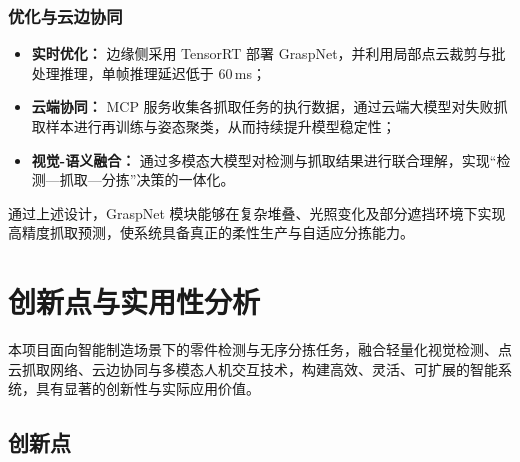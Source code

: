 \documentclass{cumcmthesis}
\begin{document}
\subsubsection{优化与云边协同}

\begin{itemize}
    \item \textbf{实时优化：} 边缘侧采用 TensorRT 部署 GraspNet，并利用局部点云裁剪与批处理推理，单帧推理延迟低于 60\,ms；
    \item \textbf{云端协同：} MCP 服务收集各抓取任务的执行数据，通过云端大模型对失败抓取样本进行再训练与姿态聚类，从而持续提升模型稳定性；
    \item \textbf{视觉-语义融合：} 通过多模态大模型对检测与抓取结果进行联合理解，实现“检测—抓取—分拣”决策的一体化。
\end{itemize}

通过上述设计，GraspNet 模块能够在复杂堆叠、光照变化及部分遮挡环境下实现高精度抓取预测，使系统具备真正的柔性生产与自适应分拣能力。


\section{创新点与实用性分析}

本项目面向智能制造场景下的零件检测与无序分拣任务，融合轻量化视觉检测、点云抓取网络、云边协同与多模态人机交互技术，构建高效、灵活、可扩展的智能系统，具有显著的创新性与实际应用价值。

\subsection{创新点}
\end{document}
